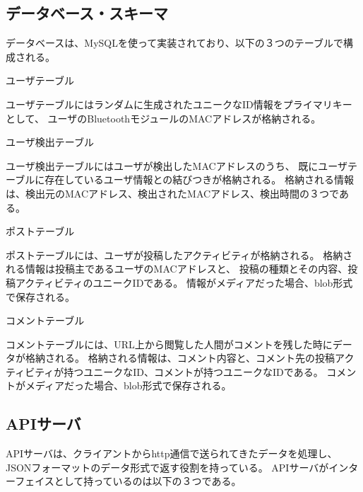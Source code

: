 \subsection{データベース・スキーマ}

データベースは、MySQLを使って実装されており、以下の３つのテーブルで構成される。

\begin{description}

\item{ユーザテーブル}

ユーザテーブルにはランダムに生成されたユニークなID情報をプライマリキーとして、
ユーザのBluetoothモジュールのMACアドレスが格納される。

\item{ユーザ検出テーブル}

ユーザ検出テーブルにはユーザが検出したMACアドレスのうち、
既にユーザテーブルに存在しているユーザ情報との結びつきが格納される。
格納される情報は、検出元のMACアドレス、検出されたMACアドレス、検出時間の３つである。

\item{ポストテーブル}

ポストテーブルには、ユーザが投稿したアクティビティが格納される。
格納される情報は投稿主であるユーザのMACアドレスと、
投稿の種類とその内容、投稿アクティビティのユニークIDである。
情報がメディアだった場合、blob形式で保存される。

\item{コメントテーブル}

コメントテーブルには、URL上から閲覧した人間がコメントを残した時にデータが格納される。
格納される情報は、コメント内容と、コメント先の投稿アクティビティが持つユニークなID、コメントが持つユニークなIDである。
コメントがメディアだった場合、blob形式で保存される。

\end{description}


\subsection{APIサーバ}

APIサーバは、クライアントからhttp通信で送られてきたデータを処理し、JSONフォーマットのデータ形式で返す役割を持っている。
APIサーバがインターフェイスとして持っているのは以下の３つである。

